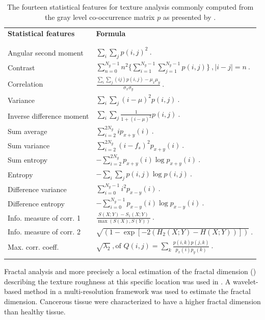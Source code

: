 \begin{enumerate}[leftmargin=*]
\begin{table}
	\caption{The fourteen statistical features for texture analysis commonly computed from the gray level co-occurrence matrix $p$ as presented by \cite{Haralick1973}.}
	\small
	\renewcommand{\arraystretch}{1.5}
	\begin{tabular}{p{.4\linewidth} p{.6\linewidth}}
		\hline %
		\textbf{Statistical features} & \textbf{Formula} \\ \\ [-3ex]
		\hline \\ [-1.5ex]
		Angular second moment & $\sum_i \sum_j p(i,j)^2 \ .$  \\
		Contrast & $\sum_{n=0}^{N_g - 1} n^2 \{ \sum_{i=1}^{N_g - 1} \sum_{j=1}^{N_g - 1} p(i,j) \} \ , | i-j |=n \ . $ \\
		Correlation & $\frac{\sum_i \sum_j (ij) p(i,j) - \mu_x \mu_y}{\sigma_x \sigma_y} \ . $ \\
		Variance & $\sum_i \sum_j (i - \mu)^2 p(i,j) \ . $ \\
		Inverse difference moment & $\sum_i \sum_j \frac{1}{1+(i - \mu)^2} p(i,j) \ . $ \\
		Sum average & $\sum_{i=2}^{2N_g} i p_{x+y}(i) \ . $ \\
		Sum variance & $\sum_{i=2}^{2N_g} (i-f_s)^2 p_{x+y}(i) \ . $ \\
		Sum entropy & $ - \sum_{i=2}^{2N_g} p_{x+y}(i) \log p_{x+y}(i) \ . $ \\
		Entropy & $ - \sum_i \sum_j p(i,j) \log p(i,j) \ .$ \\
		Difference variance & $\sum_{i=0}^{N_g-1} i^2 p_{x-y}(i) \ . $ \\
		Difference entropy & $ - \sum_{i=0}^{N_g-1} p_{x-y}(i) \log p_{x-y}(i) \ . $ \\
		Info. measure of corr. 1 & $\frac{S(X;Y)-S_1(X;Y)}{\max(S(X),S(Y))} \ . $ \\
		Info. measure of corr. 2 & $\sqrt{\left( 1 - \exp \left[ -2( H_2(X;Y) - H(X;Y) ) \right] \right)} \ . $ \\
		Max. corr. coeff. & $ \sqrt{\lambda_2} \ , \text{of } Q(i,j) = \sum_k \frac{p(i,k)p(j,k)}{p_x(i)p_y(k)} \ . $ \\
		\\ [-3ex] \hline
	\end{tabular}
	\label{tab:glcm}
\end{table}

Fractal analysis and more precisely a local estimation of the fractal dimension (\cite{Benassi1998}) describing the texture roughness at this specific location was used in \cite{Lopes2011}. A wavelet-based method in a multi-resolution framework was used to estimate the fractal dimension. Cancerous tissue were characterized to have a higher fractal dimension than healthy tissue.


\end{enumerate}
